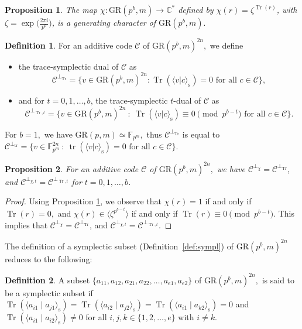 \documentclass{article}
\DeclareMathOperator{\tr}{tr}
\DeclareMathOperator{\Tr}{Tr}
\newtheorem{prop}{Proposition}[section]
\theoremstyle{remark}
\theoremstyle{definition}
\newtheorem{defin}{Definition}[section]
\numberwithin{equation}{section}
\begin{document}
\begin{prop}\label{prop:charGR}\cite{shuqin} The map $\chi: \text{GR}(p^b,m) \to \mathbb{C}^*$ defined by
$\chi(r)=\zeta^{{\Tr}(r)}$, with $\zeta = \exp\bigl(\frac{2\pi i}{p^b}\bigr)$, is a generating character of  $\text{GR}(p^b,m).$
\end{prop}


\begin{defin} 
\label{def:trace_duals}
For an additive code $\mathcal{C}$ of $\text{GR}(p^b,m)^{2n},$  we define
\begin{itemize}
\item the trace-symplectic dual of $\mathcal{C}$ as
$$\mathcal{C}^{\perp_{\Tr}} = \{v \in \text{GR}(p^b,m)^{2n} : \Tr( \langle v | c\rangle_{\mathrm{s}}) = 0 \text{~for all~} c \in \mathcal{C}\},$$
\item and for $t = 0,1,\ldots,b$, the trace-symplectic $t$-dual of $\mathcal{C}$ as 
$$\mathcal{C}^{\perp_{\Tr,t}} = \{v \in \text{GR}(p^b,m)^{2n} ~:~ \Tr( \langle v | c\rangle_{\mathrm{s}}) \equiv 0 \!\!\! \pmod{p^{b-t}} \text{~for all~} c \in \mathcal{C}\}.$$
\end{itemize}
\end{defin}
For $b=1,$ we have $\text{GR}(p,m)\simeq  \mathbb{F}_{p^m},$ thus $\mathcal{C}^{\perp_{\Tr}}$ is equal to 
$\mathcal{C}^{\perp_{\tr}} =\{v \in \mathbb{F}_{p^m}^{2n} ~:~ \tr(\langle v | c\rangle_{\mathrm{s}}) = 0 \text{ for all } c \in \mathcal{C}\}$.

\begin{prop}\label{prop:dualGR}  For an additive code $\mathcal{C}$ of $\text{GR}(p^b,m)^{2n},$ we have $\mathcal{C}^{\perp_\chi}=\mathcal{C}^{\perp_{\Tr}}$, and $\mathcal{C}^{\perp_{\chi,t}}=\mathcal{C}^{\perp_{\Tr,t}}$ for $t = 0,1,\ldots,b$.
\end{prop}
\begin{proof}Using  Proposition \ref{prop:charGR}, we observe that $\chi(r)=1$ if and only if ${\Tr}(r)=0,$ and $\chi(r) \in \langle \zeta^{p^{b-t}} \rangle $ if and only if ${\Tr}(r) \equiv 0 \pmod{p^{b-t}}$.  This implies that $\mathcal{C}^{\perp_\chi}=\mathcal{C}^{\perp_{\Tr}}$, and $\mathcal{C}^{\perp_{\chi,t}}=\mathcal{C}^{\perp_{\Tr,t}}.$
\end{proof} 
The definition of a symplectic subset (Definition~\ref{def:sympl}) of $\text{GR}(p^b,m)^{2n}$  reduces to the following:
\begin{defin} \label{def:sympl2} A subset $\{a_{11},a_{12},a_{21},a_{22},\ldots,a_{e1},a_{e2}\}$
 of $\text{GR}(p^b,m)^{2n},$ is said to be a symplectic subset if
  $\Tr( \langle a_{i1} \mid a_{j1} \rangle_{\mathrm{s}}) =\Tr(  \langle a_{i2} \mid a_{j2} \rangle_{\mathrm{s}} )= \Tr( \langle a_{i1} \mid a_{k 2} \rangle_{\mathrm{s}} )= 0$ and  $\Tr( \langle a_{i1} \mid a_{i2} \rangle_{\mathrm{s}} )\neq 0$ for all $i ,j, k \in \{1,2,\ldots,e\}$ with $i \neq k.$
 \end{defin}
\end{document}
